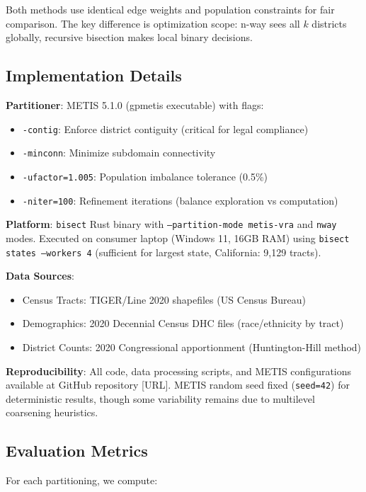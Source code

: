 Both methods use identical edge weights and population constraints for fair comparison. The key difference is optimization scope: n-way sees all $k$ districts globally, recursive bisection makes local binary decisions.

\subsection{Implementation Details}

\textbf{Partitioner}: METIS 5.1.0 (gpmetis executable) with flags:
\begin{itemize}
\item \texttt{-contig}: Enforce district contiguity (critical for legal compliance)
\item \texttt{-minconn}: Minimize subdomain connectivity
\item \texttt{-ufactor=1.005}: Population imbalance tolerance (0.5\%)
\item \texttt{-niter=100}: Refinement iterations (balance exploration vs computation)
\end{itemize}

\textbf{Platform}: \texttt{bisect} Rust binary with \texttt{--partition-mode metis-vra} and \texttt{nway} modes. Executed on consumer laptop (Windows 11, 16GB RAM) using \texttt{bisect states --workers 4} (sufficient for largest state, California: 9,129 tracts).

\textbf{Data Sources}:
\begin{itemize}
\item Census Tracts: TIGER/Line 2020 shapefiles (US Census Bureau)
\item Demographics: 2020 Decennial Census DHC files (race/ethnicity by tract)
\item District Counts: 2020 Congressional apportionment (Huntington-Hill method)
\end{itemize}

\textbf{Reproducibility}: All code, data processing scripts, and METIS configurations available at GitHub repository [URL]. METIS random seed fixed (\texttt{seed=42}) for deterministic results, though some variability remains due to multilevel coarsening heuristics.

\subsection{Evaluation Metrics}

For each partitioning, we compute:

